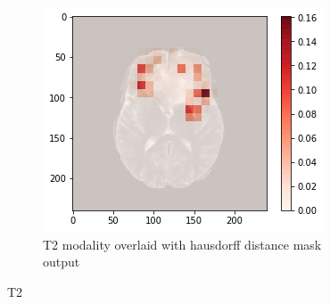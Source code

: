 \begin{figure}[H]
\begin{subfigure}{.33\textwidth}
    \end{subfigure}
        \begin{subfigure}{.33\textwidth}
        \centering
        \includegraphics[width=\linewidth]{chapters/07_brats3d/images/11_t2_hdm.png}
        \caption{T2 modality overlaid with hausdorff distance mask output}
    \end{subfigure}
    \caption{T2}
\end{figure}

